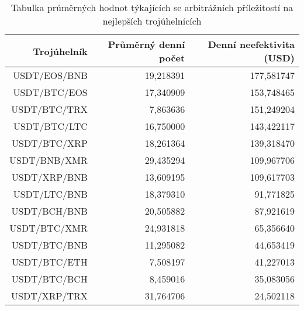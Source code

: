 \begin{table}\centering
\caption{Tabulka průměrných hodnot týkajících se arbitrážních příležitostí na nejlepších trojúhelnících}
\label{table_combined_best}
\begin{tabular}{|| r | r | r ||}\hline Trojúhelník & Průměrný denní počet & Denní neefektivita (USD)\\ [0.5ex]
 \hline\hline USDT/EOS/BNB & 19,218391 & 177,581747\\ 
 \hline USDT/BTC/EOS & 17,340909 & 153,748465\\ 
 \hline USDT/BTC/TRX & 7,863636 & 151,249204\\ 
 \hline USDT/BTC/LTC & 16,750000 & 143,422117\\ 
 \hline USDT/BTC/XRP & 18,261364 & 139,318470\\ 
 \hline USDT/BNB/XMR & 29,435294 & 109,967706\\ 
 \hline USDT/XRP/BNB & 13,609195 & 109,617703\\ 
 \hline USDT/LTC/BNB & 18,379310 & 91,771825\\ 
 \hline USDT/BCH/BNB & 20,505882 & 87,921619\\ 
 \hline USDT/BTC/XMR & 24,931818 & 65,356640\\ 
 \hline USDT/BTC/BNB & 11,295082 & 44,653419\\ 
 \hline USDT/BTC/ETH & 7,508197 & 41,227013\\ 
 \hline USDT/BTC/BCH & 8,459016 & 35,083056\\ 
 \hline USDT/XRP/TRX & 31,764706 & 24,502118\\ 
 \hline
\end{tabular}
\end{table}